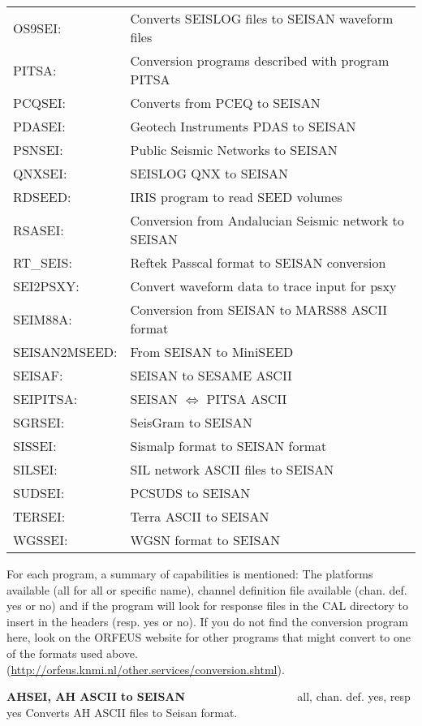 \begin{tabular}{lp{10cm}}
OS9SEI: & Converts SEISLOG files to SEISAN waveform files \\
PITSA: & Conversion programs described with program PITSA \\
PCQSEI: & Converts from PCEQ to SEISAN  \\
PDASEI: & Geotech Instruments PDAS to SEISAN  \\
PSNSEI: & Public Seismic Networks to SEISAN \\
QNXSEI: & SEISLOG QNX to SEISAN \\
RDSEED: & IRIS program to read SEED volumes \\
RSASEI: & Conversion from Andalucian Seismic network to SEISAN\index{Andalucia} \\
RT\_SEIS: & Reftek Passcal format to SEISAN conversion \\
SEI2PSXY: & Convert waveform data to trace input for psxy \\
SEIM88A: & Conversion from SEISAN to MARS88 ASCII format \\
SEISAN2MSEED: & From SEISAN to MiniSEED \\
SEISAF: & SEISAN to SESAME ASCII \\
SEIPITSA: & SEISAN $\Leftrightarrow$ PITSA ASCII \\
SGRSEI: & SeisGram to SEISAN \\
SISSEI: & Sismalp format to SEISAN format \\
SILSEI: & SIL network ASCII files to SEISAN \\
SUDSEI: & PCSUDS to SEISAN \\
TERSEI: & Terra ASCII to SEISAN \\
WGSSEI: & WGSN format to SEISAN 
\end{tabular}

For each program, a summary of capabilities is mentioned: The platforms 
available (all for all or specific name), channel definition file 
available (chan. def. yes or no) and if the program will look for 
response files in the CAL directory to insert in the headers (resp. yes or no). \newline
If you do not find the conversion program here, look on the  ORFEUS 
website for other programs that might convert to one 
of the formats used above. \newline
(\url{http://orfeus.knmi.nl/other.services/conversion.shtml}). 

{
\textbf{AHSEI, AH ASCII to SEISAN} \verb|                  | all, chan. def. yes, resp yes\newline
{}
Converts AH ASCII files to Seisan format.
}

